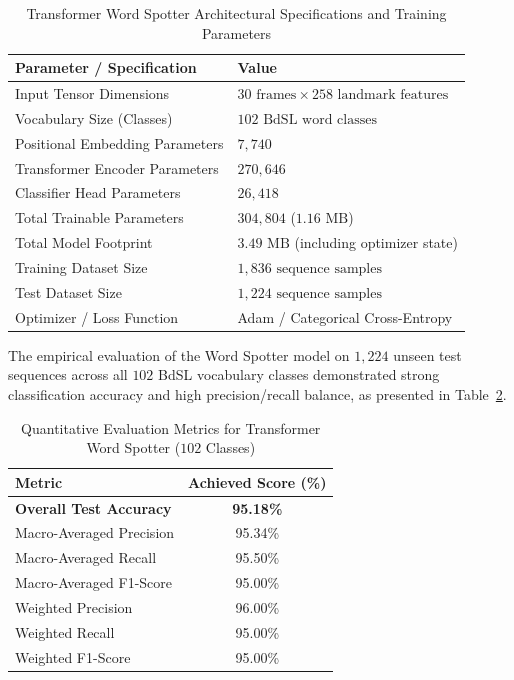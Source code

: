 \begin{table}[h]
\centering
\caption{Transformer Word Spotter Architectural Specifications and Training Parameters}
\label{tab:transformer_specs}
\begin{tabular}{|l|l|}
\hline
\textbf{Parameter / Specification} & \textbf{Value} \\ \hline
Input Tensor Dimensions & $30 \text{ frames} \times 258 \text{ landmark features}$ \\ \hline
Vocabulary Size (Classes) & $102 \text{ BdSL word classes}$ \\ \hline
Positional Embedding Parameters & $7,740$ \\ \hline
Transformer Encoder Parameters & $270,646$ \\ \hline
Classifier Head Parameters & $26,418$ \\ \hline
Total Trainable Parameters & $304,804$ ($1.16 \text{ MB}$) \\ \hline
Total Model Footprint & $3.49 \text{ MB}$ (including optimizer state) \\ \hline
Training Dataset Size & $1,836 \text{ sequence samples}$ \\ \hline
Test Dataset Size & $1,224 \text{ sequence samples}$ \\ \hline
Optimizer / Loss Function & Adam / Categorical Cross-Entropy \\ \hline
\end{tabular}
\end{table}

The empirical evaluation of the Word Spotter model on $1,224$ unseen test sequences across all $102$ BdSL vocabulary classes demonstrated strong classification accuracy and high precision/recall balance, as presented in Table~\ref{tab:transformer_metrics}.

\begin{table}[h]
\centering
\caption{Quantitative Evaluation Metrics for Transformer Word Spotter ($102$ Classes)}
\label{tab:transformer_metrics}
\begin{tabular}{|l|c|}
\hline
\textbf{Metric} & \textbf{Achieved Score (\%)} \\ \hline
\textbf{Overall Test Accuracy} & \textbf{95.18\%} \\ \hline
Macro-Averaged Precision & 95.34\% \\ \hline
Macro-Averaged Recall & 95.50\% \\ \hline
Macro-Averaged F1-Score & 95.00\% \\ \hline
Weighted Precision & 96.00\% \\ \hline
Weighted Recall & 95.00\% \\ \hline
Weighted F1-Score & 95.00\% \\ \hline
\end{tabular}
\end{table}

